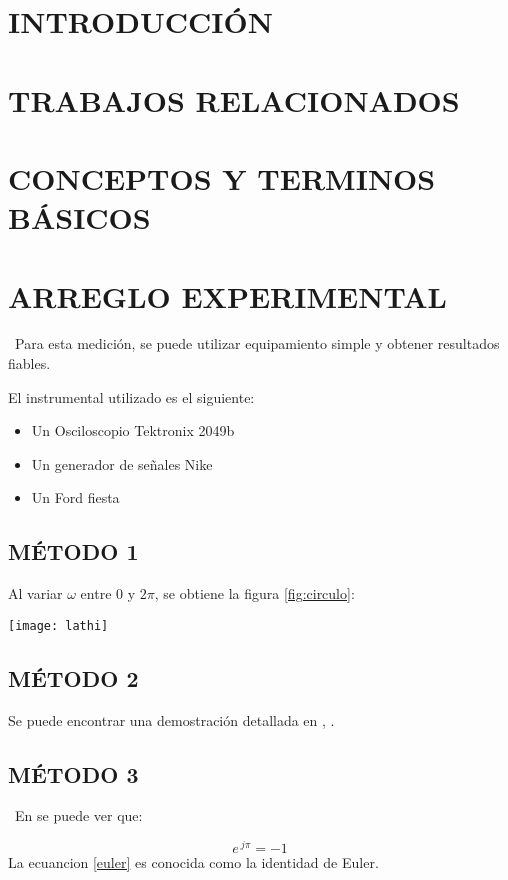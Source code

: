 \documentclass[]{article}
\makeatletter
\newenvironment{figurehere}		%
  {\def\@captype{figure}}		%
  {}							%
\makeatother
\begin{document}
\begin{multicols}{2}
\section{INTRODUCCIÓN}
\lipsum[2]
\section{TRABAJOS RELACIONADOS}
\lipsum[3]
\section{CONCEPTOS Y TERMINOS BÁSICOS}
\lipsum[4]
\section{ARREGLO EXPERIMENTAL}
\lipsum[5]
\
Para esta medición, se puede utilizar equipamiento simple y obtener resultados fiables.

El instrumental utilizado es el siguiente:
\begin{itemize}
  \item Un Osciloscopio Tektronix 2049b
  \item Un generador de señales Nike
  \item Un Ford fiesta
\end{itemize}
\subsection{MÉTODO 1}
\lipsum[6]
Al variar $\omega$ entre $0$ y $2 \pi$, se obtiene la figura \ref{fig:circulo}:

\begin{figurehere}
 \centering
 \texttt{[image: lathi]}
 \label{fig:circulo}
\end{figurehere}

\subsection{MÉTODO 2} %
\lipsum[7]
Se puede encontrar una demostración detallada en \cite{Sh:575} , \cite{Sh:572}.
\subsection{MÉTODO 3} %
\
\lipsum[8] En \cite{webster} se puede ver que:

\begin{equation}
 e^{ \ j  \pi} = -1
 \label{euler}
\end{equation}
La ecuancion \ref{euler} es conocida como la identidad de Euler.

\end{multicols}
\end{document}

